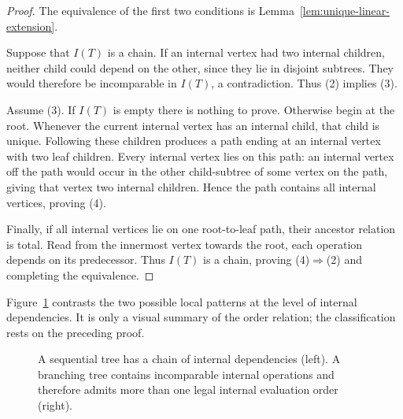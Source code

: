 \begin{proof}
The equivalence of the first two conditions is
Lemma~\ref{lem:unique-linear-extension}.

Suppose that $I(T)$ is a chain.  If an internal vertex had two internal
children, neither child could depend on the other, since they lie in disjoint
subtrees.  They would therefore be incomparable in $I(T)$, a contradiction.
Thus (2) implies (3).

Assume (3).  If $I(T)$ is empty there is nothing to prove.  Otherwise begin at
the root.  Whenever the current internal vertex has an internal child, that
child is unique.  Following these children produces a path ending at an
internal vertex with two leaf children.  Every internal vertex lies on this
path: an internal vertex off the path would occur in the other child-subtree
of some vertex on the path, giving that vertex two internal children.  Hence
the path contains all internal vertices, proving (4).

Finally, if all internal vertices lie on one root-to-leaf path, their ancestor
relation is total.  Read from the innermost vertex towards the root, each
operation depends on its predecessor.  Thus $I(T)$ is a chain, proving
(4)$\Rightarrow$(2) and completing the equivalence.
\end{proof}

Figure~\ref{fig:sequential-branching-dependency} contrasts the two possible
local patterns at the level of internal dependencies.  It is only a visual
summary of the order relation; the classification rests on the preceding
proof.

\begin{figure}[t]
\centering
{}
\caption{A sequential tree has a chain of internal dependencies (left).  A
branching tree contains incomparable internal operations and therefore admits
more than one legal internal evaluation order (right).}
\label{fig:sequential-branching-dependency}
\end{figure}

